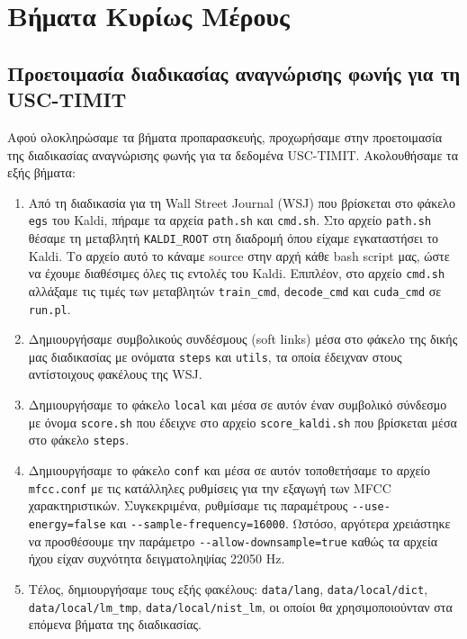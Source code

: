 \documentclass[a4paper,12pt]{article}
\begin{document}
\section{Βήματα Κυρίως Μέρους}

\subsection{Προετοιμασία διαδικασίας αναγνώρισης φωνής για τη USC-TIMIT}

Αφού ολοκληρώσαμε τα βήματα προπαρασκευής, προχωρήσαμε στην προετοιμασία της διαδικασίας αναγνώρισης φωνής για τα δεδομένα USC-TIMIT. Ακολουθήσαμε τα εξής βήματα:

\begin{enumerate}
    \item Από τη διαδικασία για τη Wall Street Journal (WSJ) που βρίσκεται στο φάκελο \verb|egs| του Kaldi, πήραμε τα αρχεία \verb|path.sh| και \verb|cmd.sh|. Στο αρχείο \verb|path.sh| θέσαμε τη μεταβλητή \verb|KALDI_ROOT| στη διαδρομή όπου είχαμε εγκαταστήσει το Kaldi. Το αρχείο αυτό το κάναμε source στην αρχή κάθε bash script μας, ώστε να έχουμε διαθέσιμες όλες τις εντολές του Kaldi. Επιπλέον, στο αρχείο \verb|cmd.sh| αλλάξαμε τις τιμές των μεταβλητών \verb|train_cmd|, \verb|decode_cmd| και \verb|cuda_cmd| σε \verb|run.pl|.
    
    \item Δημιουργήσαμε συμβολικούς συνδέσμους (soft links) μέσα στο φάκελο της δικής μας διαδικασίας με ονόματα \verb|steps| και \verb|utils|, τα οποία έδειχναν στους αντίστοιχους φακέλους της WSJ.
    
    \item Δημιουργήσαμε το φάκελο \verb|local| και μέσα σε αυτόν έναν συμβολικό σύνδεσμο με όνομα \verb|score.sh| που έδειχνε στο αρχείο \verb|score_kaldi.sh| που βρίσκεται μέσα στο φάκελο \verb|steps|.
    
    \item Δημιουργήσαμε το φάκελο \verb|conf| και μέσα σε αυτόν τοποθετήσαμε το αρχείο \verb|mfcc.conf| με τις κατάλληλες ρυθμίσεις για την εξαγωγή των MFCC χαρακτηριστικών. Συγκεκριμένα, ρυθμίσαμε τις παραμέτρους \verb|--use-energy=false| και \verb|--sample-frequency=16000|. Ωστόσο, αργότερα χρειάστηκε να προσθέσουμε την παράμετρο \verb|--allow-downsample=true| καθώς τα αρχεία ήχου είχαν συχνότητα δειγματοληψίας 22050 Hz.
    
    \item Τέλος, δημιουργήσαμε τους εξής φακέλους: \verb|data/lang|, \verb|data/local/dict|, \verb|data/local/lm_tmp|, \verb|data/local/nist_lm|, οι οποίοι θα χρησιμοποιούνταν στα επόμενα βήματα της διαδικασίας.
\end{enumerate}
\end{document}
